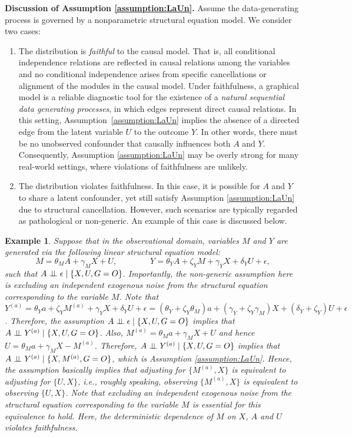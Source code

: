 \documentclass[10pt]{article}
\newtheorem{example}{Example}
\newcommand{\independent}{\perp\mkern-9.5mu\perp}
\begin{document}
\noindent
{\bf Discussion of Assumption \ref{assumption:LaUn}.}
Assume the data-generating process is governed by a nonparametric structural equation model. We consider two cases:
\begin{enumerate}
\item The distribution is \emph{faithful} \citep{spirtes2000causation} to the causal model. That is, all conditional independence relations are reflected in causal relations among the variables and no conditional independence arises from specific cancellations or alignment of the modules in the causal model. Under faithfulness, a graphical model is a reliable diagnostic tool for the existence of a \emph{natural sequential data generating processes}, in which edges represent direct causal relations. In this setting, Assumption~\ref{assumption:LaUn} implies the absence of a directed edge from the latent variable \( U \) to the outcome \( Y \). In other words, there must be no unobserved confounder that causally influences both \( A \) and \( Y \). Consequently, Assumption \ref{assumption:LaUn} may be overly strong for many real-world settings, where violations of faithfulness are unlikely.
\item The distribution violates faithfulness. In this case, it is possible for \( A \) and \( Y \) to share a latent confounder, yet still satisfy Assumption \ref{assumption:LaUn} due to structural cancellation. However, such scenarios are typically regarded as pathological or non-generic. An example of this case is discussed below.
\end{enumerate}
\begin{example}
\label{ex:1}
Suppose that in the observational domain, variables $M$ and $Y$ are generated via the following linear structural equation model:
\[
M = \theta_M A+\gamma_M X+U,\qquad\qquad Y = \theta_Y A+\zeta_Y M+\gamma_Y X	+\delta_Y U +\epsilon,
\]
such that $A\independent\epsilon\mid \{X,U,G=O\}$. 
Importantly, the non-generic assumption here is excluding an independent exogenous noise from the structural equation corresponding to the variable $M$.
Note that $Y^{(a)}=\theta_Y a+\zeta_Y M^{(a)}+\gamma_Y X+\delta_Y U+\epsilon = (\theta_Y+\zeta_Y\theta_M) a+(\gamma_Y+\zeta_Y\gamma_M) X+(\delta_Y+\zeta_Y) U+\epsilon$.
Therefore, the assumption $A\independent\epsilon\mid \{X,U,G=O\}$ implies that $A\independent Y^{(a)}\mid \{X,U,G=O\}$. Also, $M^{(a)}=\theta_M a+\gamma_M X+U$ and hence $U=\theta_M a+\gamma_M X-M^{(a)}$. Therefore, $A\independent Y^{(a)}\mid \{X,U,G=O\}$ implies that $A\independent Y^{(a)}\mid \{X,M^{(a)},G=O\}$, which is Assumption \ref{assumption:LaUn}.
Hence, the assumption basically implies that adjusting for $\{M^{(a)},X\}$ is equivalent to adjusting for $\{U,X\}$, i.e., roughly speaking, observing $\{M^{(a)},X\}$ is equivalent to observing $\{U,X\}$.
Note that excluding an independent exogenous noise from the structural equation corresponding to the variable $M$ is essential for this equivalence to hold. Here, the deterministic dependence of $M$ on $X$, $A$ and $U$ violates faithfulness.
\end{example}
\end{document}
